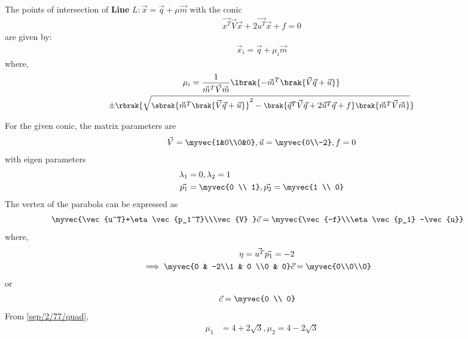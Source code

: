\begin{lemma}
The points of intersection of \textbf{Line} $L:\vec{x}=\vec{q}+\mu\vec{m}$ with the conic 
\begin{align}
\vec{x^T}\vec{V}\vec{x}+2\vec{u^T}\vec{x}+f=0
\end{align}
are given by:
\begin{align}
\vec{x}_i = \vec{q}+\mu_i\vec{m}
\end{align}
%
where,
\begin{multline}
\mu_i = \frac{1}
{
\vec{m}^T\vec{V}\vec{m}
}
\lbrak{-\vec{m}^T\brak{\vec{V}\vec{q}+\vec{u}}}
\\
\pm
{\small
\rbrak{\sqrt{
\sbrak{
\vec{m}^T\brak{\vec{V}\vec{q}+\vec{u}}
}^2
-
\brak
{
\vec{q}^T\vec{V}\vec{q} + 2\vec{u}^T\vec{q} +f
}
\brak{\vec{m}^T\vec{V}\vec{m}}
}
}
}\label{sep/2/77/quad}
\end{multline}
\end{lemma}
For the given conic, the matrix parameters  are
\begin{align}
\vec{V}=\myvec{1&0\\0&0},\vec{u}=\myvec{0\\-2},f=0 \label{sep/2/77/quadform/2/105/eq:v}
\end{align}
with eigen parameters 
\begin{align}
\lambda_1 &= 0 , \lambda_2 = 1
\\
\vec{p_1} &= \myvec{0 \\ 1},
\vec{p_2} = \myvec{1 \\ 0}
\end{align}
The vertex of the parabola can be expressed as
\begin{align} \myvec{\vec{u^T}+\eta\vec{p_1^T}\\\vec{V} }\vec{c} &= \myvec{\vec{-f}\\\eta \vec{p_1} -\vec{u}}
\end{align}
where, 
\begin{align}\eta = \vec{u^T}\vec{p_1} = -2
\\
\implies\myvec{0 & -2\\1 & 0 \\0 & 0} \vec{c}&= \myvec{0\\0\\0}
\end{align}
or
\begin{align}
   \vec{c} &= \myvec{0 \\ 0}
\end{align}
From  \eqref{sep/2/77/quad},
\begin{align}
\mu_1 &= 4+2\sqrt{3}, \mu_2 =4-2\sqrt{3}
\end{align}

